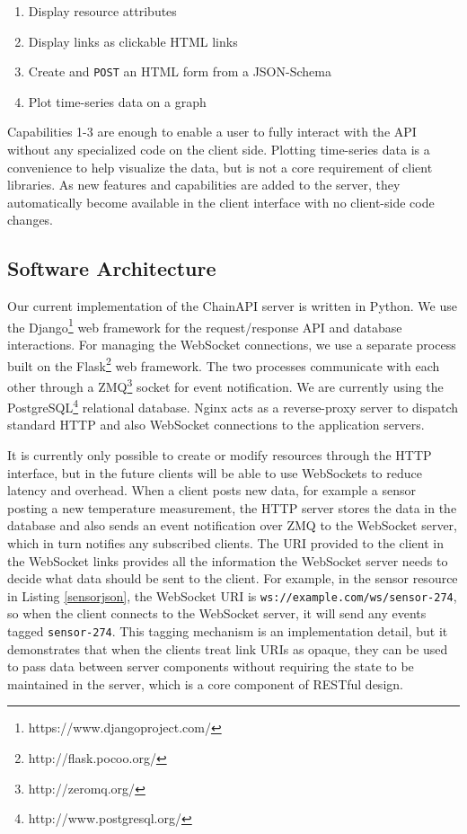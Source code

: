 \documentclass{acm_proc_article-sp}
\newenvironment{tightenumerate}{
    \vspace{-10pt}
    \begin{enumerate}
        \setlength{\parskip}{-1pt}}{
    \end{enumerate}
    \vspace{-10pt}}
\begin{document}
\begin{tightenumerate}
    \item Display resource attributes
    \item Display links as clickable HTML links
    \item Create and \texttt{POST} an HTML form from a JSON-Schema
    \item Plot time-series data on a graph
\end{tightenumerate}

Capabilities 1-3 are enough to enable a user to fully interact with the API
without any specialized code on the client side. Plotting time-series data is a
convenience to help visualize the data, but is not a core requirement of client
libraries. As new features and capabilities are added to the server, they
automatically become available in the client interface with no client-side code
changes.

\subsection{Software Architecture}

Our current implementation of the ChainAPI server is written in Python. We use
the Django\footnote{https://www.djangoproject.com/} web framework for the
request/response API and database interactions. For managing the WebSocket
connections, we use a separate process built on the
Flask\footnote{http://flask.pocoo.org/} web framework. The two processes
communicate with each other through a ZMQ\footnote{http://zeromq.org/} socket
for event notification. We are currently using the
PostgreSQL\footnote{http://www.postgresql.org/} relational database. Nginx acts
as a reverse-proxy server to dispatch standard HTTP and also WebSocket
connections to the application servers.

It is currently only possible to create or modify resources through the HTTP
interface, but in the future clients will be able to use WebSockets to reduce
latency and overhead. When a client posts new data, for example a sensor
posting a new temperature measurement, the HTTP server stores the data in the
database and also sends an event notification over ZMQ to the WebSocket server,
which in turn notifies any subscribed clients. The URI provided to the client
in the WebSocket links provides all the information the WebSocket server needs
to decide what data should be sent to the client. For example, in the sensor
resource in Listing \ref{sensorjson}, the WebSocket URI is
\texttt{ws://example.com/ws/sensor-274}, so when the client connects to the
WebSocket server, it will send any events tagged \texttt{sensor-274}. This
tagging mechanism is an implementation detail, but it demonstrates that when
the clients treat link URIs as opaque, they can be used to pass data between
server components without requiring the state to be maintained in the server,
which is a core component of RESTful design.
\end{document}
